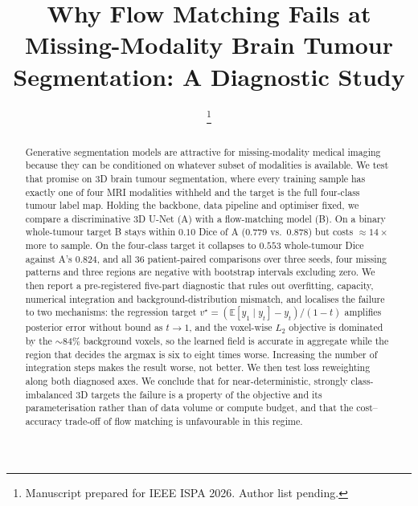 \documentclass[conference]{IEEEtran}
\begin{document}
\title{Why Flow Matching Fails at Missing-Modality Brain Tumour\\ Segmentation: A Diagnostic Study}

\author{
\thanks{Manuscript prepared for IEEE ISPA 2026. Author list pending.}
}

\maketitle

\begin{abstract}
Generative segmentation models are attractive for missing-modality medical
imaging because they can be conditioned on whatever subset of modalities is
available. We test that promise on 3D brain tumour segmentation, where every
training sample has exactly one of four MRI modalities withheld and the target
is the full four-class tumour label map. Holding the backbone, data pipeline and
optimiser fixed, we compare a discriminative 3D U-Net (A) with a flow-matching
model (B). On a binary whole-tumour target B stays within $0.10$ Dice of A
($0.779$ vs.\ $0.878$) but costs $\approx 14\times$ more to sample. On the
four-class target it collapses to $0.553$ whole-tumour Dice against A's $0.824$,
and all $36$ patient-paired comparisons over three seeds, four missing patterns
and three regions are negative with bootstrap intervals excluding zero. We then
report a pre-registered five-part diagnostic that rules out overfitting,
capacity, numerical integration and background-distribution mismatch, and
localises the failure to two mechanisms: the regression target
$v^\star = (\mathbb{E}[y_1\mid y_t] - y_t)/(1-t)$ amplifies posterior error
without bound as $t \to 1$, and the voxel-wise $L_2$ objective is dominated by
the $\sim$$84\%$ background voxels, so the learned field is accurate in
aggregate while the region that decides the argmax is six to eight times worse.
Increasing the number of integration steps makes the result worse, not better.
We then test loss reweighting along both diagnosed axes.
\REMEDYABSTRACT
We conclude that for near-deterministic, strongly class-imbalanced 3D targets
the failure is a property of the objective and its parameterisation rather than
of data volume or compute budget, and that the cost--accuracy trade-off of flow
matching is unfavourable in this regime.
\end{abstract}
\end{document}
